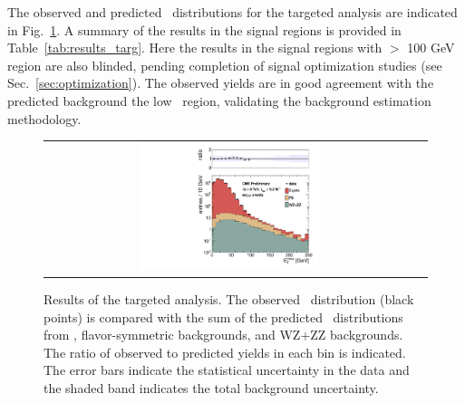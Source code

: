 \clearpage

The observed and predicted \MET\ distributions for the targeted analysis are indicated in Fig.~\ref{fig:results_targ}. A summary of the 
results in the signal regions is provided in Table~\ref{tab:results_targ}. 
Here the results in the signal regions with \MET $>$ 100 GeV region are also blinded, pending completion of signal optimization studies
(see Sec.~\ref{sec:optimization}).
The observed yields are in good agreement with the predicted background the low \MET\ region, validating the background estimation
methodology.

\begin{figure}[!h]
\begin{center}
\begin{tabular}{cc}
\includegraphics[width=0.5\textwidth]{plots/pfmet_bvetoMedium_all_92fb.pdf}
\end{tabular}
\caption{Results of the targeted analysis. The observed \MET\ distribution (black points) is compared with the sum of the predicted \MET\
distributions from \zjets, flavor-symmetric backgrounds, and WZ+ZZ backgrounds. The ratio of observed to predicted yields in each bin is
indicated. The error bars indicate the statistical uncertainty in the data and the shaded band indicates the total background uncertainty.
\label{fig:results_targ}
}
\end{center}
\end{figure}



